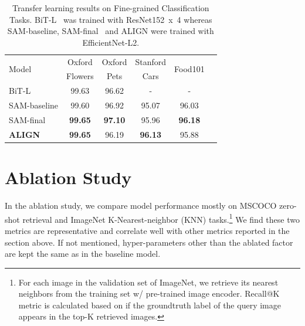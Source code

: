 \documentclass{article}
\begin{document}
\begin{table}[h!]
\vspace{-5mm}
\begin{center}
\caption{Transfer learning results on Fine-grained Classification Tasks. BiT-L~\cite{kolensnikov:bit} was trained with ResNet152~x~4 whereas SAM-baseline, SAM-final~\cite{foret:sam} and ALIGN were trained with EfficientNet-L2.}
\label{tab:small_result}
\vskip 0.05in
\begin{small}
\begin{tabular}{l|ccccc}
\toprule
\multirow{2}{*}{Model} & Oxford  & Oxford & Stanford & \multirow{2}{*}{Food101} \\
& Flowers & Pets & Cars & \\
\midrule
BiT-L& 99.63 & 96.62 & -  & - \\
SAM-baseline
& 99.60 & 96.92 & 95.07 & 96.03 \\
SAM-final
& \textbf{99.65} & \textbf{97.10} & 95.96  & \textbf{96.18} \\
\bf{ALIGN}
& \textbf{99.65} & 96.19 & \textbf{96.13} & 95.88 \\
\bottomrule
\end{tabular}
\end{small}
\end{center}
\vspace{-5mm}
\end{table}

\section{Ablation Study}\label{sec:ablation}

In the ablation study, we compare model performance mostly on MSCOCO zero-shot retrieval and ImageNet K-Nearest-neighbor (KNN) tasks.\footnote{For each image in the validation set of ImageNet, we retrieve its nearest neighbors from the training set w/ pre-trained image encoder. Recall@K metric is calculated based on if the groundtruth label of the query image appears in the top-K retrieved images.} We find these two metrics are representative and correlate well with other metrics reported in the section above. If not mentioned, hyper-parameters other than the ablated factor are kept the same as in the baseline model.
\end{document}
